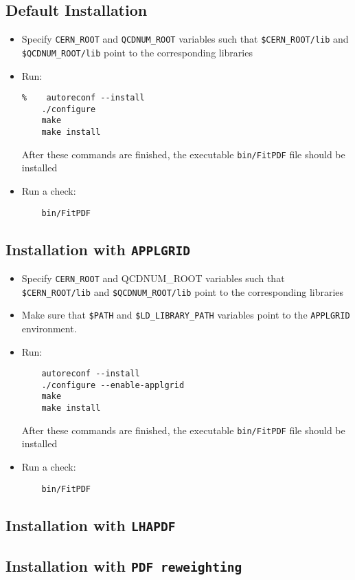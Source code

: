 \documentclass[11pt,a4paper]{article}
\begin{document}
\subsection{Default Installation}
\begin{itemize}
\item
 Specify {\tt CERN\_ROOT} 
     and {\tt QCDNUM\_ROOT} variables such that 
     {\tt \$CERN\_ROOT/lib}  and {\tt \$QCDNUM\_ROOT/lib}
 point to the corresponding libraries
\item Run:
\begin{verbatim}
%    autoreconf --install
    ./configure
    make 
    make install
\end{verbatim}
After these commands are finished, the executable {\tt bin/FitPDF} 
file should be installed
\item  Run a check:
\begin{verbatim}
    bin/FitPDF 
\end{verbatim}
\end{itemize}
\subsection{Installation with {\tt APPLGRID}}
\begin{itemize}
\item
 Specify {\tt CERN\_ROOT} and {QCDNUM\_ROOT} variables such that 
     {\tt \$CERN\_ROOT/lib}  and {\tt \$QCDNUM\_ROOT/lib}
 point to the corresponding libraries
\item Make sure that {\tt \$PATH} and {\tt \$LD\_LIBRARY\_PATH} 
variables point to the {\tt APPLGRID} environment.
\item Run:
\begin{verbatim}
    autoreconf --install
    ./configure --enable-applgrid
    make 
    make install
\end{verbatim}
After these commands are finished, the executable {\tt bin/FitPDF} 
file should be installed
\item  Run a check:
\begin{verbatim}
    bin/FitPDF 
\end{verbatim}
\end{itemize}
\subsection{Installation with {\tt LHAPDF}}\label{sec:install_lhapdf}
\subsection{Installation with {\tt PDF reweighting}}\label{sec:install_nnpdfrweight}
\end{document}

